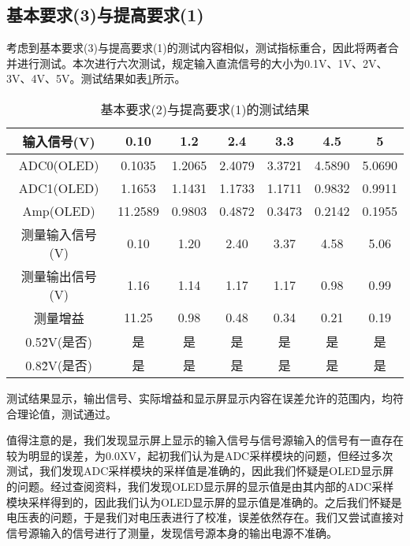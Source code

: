 \documentclass[lang=cn,11pt,a4paper]{elegantpaper}
\begin{document}
\subsection{基本要求(3)与提高要求(1)}
考虑到基本要求(3)与提高要求(1)的测试内容相似，测试指标重合，因此将两者合并进行测试。本次进行六次测试，规定输入直流信号的大小为0.1V、1V、2V、3V、4V、5V。测试结果如表\ref{tab:3_1}所示。
\begin{table}[!ht]
  \centering
  \caption{基本要求(2)与提高要求(1)的测试结果}
  \begin{tabular}{ccccccc}
    \textbf{输入信号(V)} & \textbf{0.10} & \textbf{1.2} & \textbf{2.4} & \textbf{3.3} & \textbf{4.5} & \textbf{5} \\ \hline
    ADC0(OLED)       & 0.1035        & 1.2065       & 2.4079       & 3.3721       & 4.5890       & 5.0690     \\
    ADC1(OLED)       & 1.1653        & 1.1431       & 1.1733       & 1.1711       & 0.9832       & 0.9911     \\
    Amp(OLED)        & 11.2589       & 0.9803       & 0.4872       & 0.3473       & 0.2142       & 0.1955     \\
    测量输入信号(V)        & 0.10          & 1.20         & 2.40         & 3.37         & 4.58         & 5.06       \\
    测量输出信号(V)        & 1.16          & 1.14         & 1.17         & 1.17         & 0.98         & 0.99       \\
    测量增益             & 11.25         & 0.98         & 0.48         & 0.34         & 0.21         & 0.19       \\
    0.5\~2V(是否)      & 是             & 是            & 是            & 是            & 是            & 是          \\
    0.8\~2V(是否)      & 是             & 是            & 是            & 是            & 是            & 是          \\
  \end{tabular}
  \label{tab:3_1}
\end{table}
测试结果显示，输出信号、实际增益和显示屏显示内容在误差允许的范围内，均符合理论值，测试通过。

值得注意的是，我们发现显示屏上显示的输入信号与信号源输入的信号有一直存在较为明显的误差，为0.0XV，起初我们认为是ADC采样模块的问题，但经过多次测试，我们发现ADC采样模块的采样值是准确的，因此我们怀疑是OLED显示屏的问题。经过查阅资料，我们发现OLED显示屏的显示值是由其内部的ADC采样模块采样得到的，因此我们认为OLED显示屏的显示值是准确的。之后我们怀疑是电压表的问题，于是我们对电压表进行了校准，误差依然存在。我们又尝试直接对信号源输入的信号进行了测量，发现信号源本身的输出电源不准确。
\end{document}
